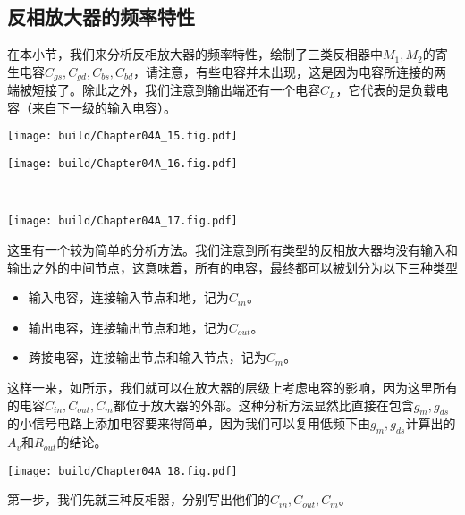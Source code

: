 \subsection{反相放大器的频率特性}

在本小节，我们来分析反相放大器的频率特性，绘制了三类反相器中$M_1,M_2$的寄生电容$C_{gs},C_{gd},C_{bs},C_{bd}$，请注意，有些电容并未出现，这是因为电容所连接的两端被短接了。除此之外，我们注意到输出端还有一个电容$C_L$，它代表的是负载电容（来自下一级的输入电容）。
\begin{Figure}[反相放大器的电容]
    \begin{FigureSub}[二极管负载反相放大器的电容]
        \texttt{[image: build/Chapter04A\_15.fig.pdf]}
    \end{FigureSub}\qquad
    \begin{FigureSub}[电流源负载反相放大器的电容]
        \texttt{[image: build/Chapter04A\_16.fig.pdf]}
    \end{FigureSub}\\ \vspace{0.25cm}
    \begin{FigureSub}[推挽反相放大器的电容]
        \texttt{[image: build/Chapter04A\_17.fig.pdf]}
    \end{FigureSub}
\end{Figure}

这里有一个较为简单的分析方法。我们注意到所有类型的反相放大器均没有输入和输出之外的中间节点，这意味着，所有的电容，最终都可以被划分为以下三种类型
\begin{itemize}
    \item 输入电容，连接输入节点和地，记为$C_{in}$。
    \item 输出电容，连接输出节点和地，记为$C_{out}$。
    \item 跨接电容，连接输出节点和输入节点，记为$C_m$。
\end{itemize}
这样一来，如所示，我们就可以在放大器的层级上考虑电容的影响，因为这里所有的电容$C_{in},C_{out},C_{m}$都位于放大器的外部。这种分析方法显然比直接在包含$g_{m},g_{ds}$的小信号电路上添加电容要来得简单，因为我们可以复用低频下由$g_{m},g_{ds}$计算出的$A_v$和$R_{out}$的结论。

\begin{Figure}[反相放大器的频率特性分析]
    \texttt{[image: build/Chapter04A\_18.fig.pdf]}
\end{Figure}

第一步，我们先就三种反相器，分别写出他们的$C_{in},C_{out},C_m$。

